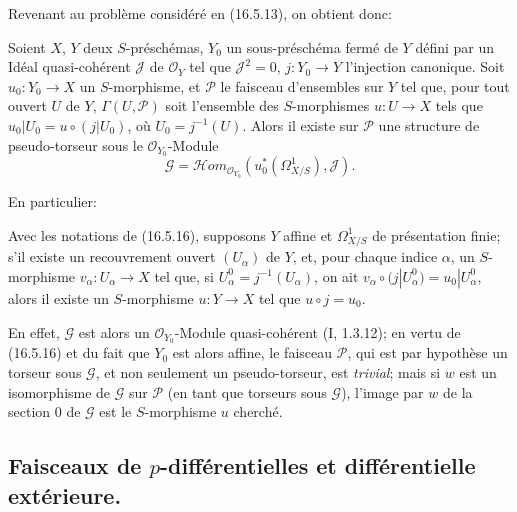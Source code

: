 Revenant au problème considéré en (16.5.13), on obtient donc:

\begin{proposition}[16.5.17]
\label{IV.16.5.17}
Soient $X$, $Y$ deux $S$-préschémas, $Y_0$ un sous-préschéma fermé de $Y$
défini par un Idéal quasi-cohérent $\mathscr{J}$ de $\mathcal{O}_Y$ tel que
$\mathscr{J}^2=0$, $j:Y_0\to Y$ l'injection canonique. Soit
$u_0:Y_0\to X$ un $S$-morphisme, et $\mathscr{P}$ le faisceau d'ensembles sur
$Y$ tel que, pour tout ouvert $U$ de $Y$, $\Gamma(U,\mathscr{P})$ soit
l'ensemble des $S$-morphismes $u:U\to X$ tels que
$u_0|U_0=u\circ(j|U_0)$, où $U_0=j^{-1}(U)$. Alors il existe sur
$\mathscr{P}$ une structure de pseudo-torseur sous le
$\mathcal{O}_{Y_0}$-Module
\[
  \mathscr{G}=\mathscr{H}om_{\mathcal{O}_{Y_0}}
  (u_0^*(\Omega_{X/S}^1),\mathscr{J}).
\]
\end{proposition}

En particulier:

\begin{corollary}[16.5.18]
\label{IV.16.5.18}
Avec les notations de (16.5.16), supposons $Y$ affine et $\Omega_{X/S}^1$ de
présentation finie; s'il existe un recouvrement ouvert $(U_\alpha)$ de $Y$,
et, pour chaque indice $\alpha$, un $S$-morphisme $v_\alpha:U_\alpha\to X$
tel que, si $U_\alpha^0=j^{-1}(U_\alpha)$, on ait
$v_\alpha\circ(j|U_\alpha^0)=u_0|U_\alpha^0$, alors il existe un
$S$-morphisme $u:Y\to X$ tel que $u\circ j=u_0$.
\end{corollary}

En effet, $\mathscr{G}$ est alors un $\mathcal{O}_{Y_0}$-Module
quasi-cohérent (I, 1.3.12); en vertu de (16.5.16) et du fait que $Y_0$ est
alors affine, le faisceau $\mathscr{P}$, qui est par hypothèse un torseur sous
$\mathscr{G}$, et non seulement un pseudo-torseur, est \emph{trivial}; mais si
$w$ est un isomorphisme de $\mathscr{G}$ sur $\mathscr{P}$ (en tant que
torseurs sous $\mathscr{G}$), l'image par $w$ de la section 0 de
$\mathscr{G}$ est le $S$-morphisme $u$ cherché.

\subsection{\texorpdfstring{Faisceaux de $p$-différentielles et différentielle extérieure.}{Faisceaux de p-différentielles et différentielle extérieure.}}

